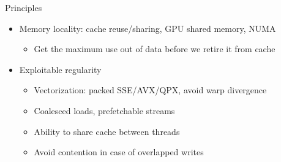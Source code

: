 \documentclass{beamer}
\begin{document}
\begin{frame}{Principles}
  \begin{itemize}
  \item Memory locality: cache reuse/sharing, GPU shared memory, NUMA
    \begin{itemize}
    \item Get the maximum use out of data before we retire it from cache
    \end{itemize}
  \item Exploitable regularity
    \begin{itemize}
    \item Vectorization: packed SSE/AVX/QPX, avoid warp divergence
    \item Coalesced loads, prefetchable streams
    \item Ability to share cache between threads
    \item Avoid contention in case of overlapped writes
    \end{itemize}
  \end{itemize}
\end{frame}
\end{document}
